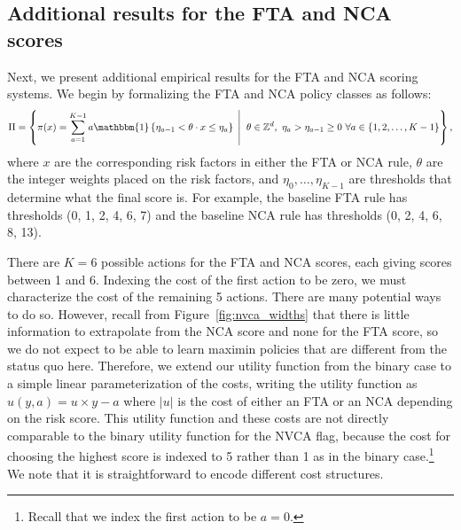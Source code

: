 \documentclass[12pt]{article}
\theoremstyle{definition}
\newcommand{\Z}{\ensuremath{\mathbb{Z}}}
\newcommand{\bbone}{\ensuremath{\mathbbm{1}}}
\newcommand{\<}{\langle}
\renewcommand{\>}{\rangle}
\begin{document}
\subsection{Additional results for the FTA and NCA scores}
\label{sec:addl_fta_nca}

Next, we present additional empirical results for the FTA and NCA
scoring systems.  We begin by formalizing the FTA and NCA policy
classes as follows:
\[
  \label{eq:integer_weight_policy}
  \Pi = \left\{\pi(x) = \sum_{a = 1}^{K-1}a \bbone\left\{\eta_{a-1} <
      \theta \cdot x \leq \eta_a \right\} \; \left \vert
      \vphantom{\sum_{j=1}^7 }\right. \; \theta \in \Z^d, \ \eta_a > \eta_{a-1}
    \geq 0 \ \forall a \in \{1, 2, \ldots, K-1\} \right\},
\]
where $x$ are the corresponding risk factors in either the FTA or NCA
rule, $\theta$ are the integer weights placed on the risk factors, and
$\eta_0,\ldots,\eta_{K-1}$ are thresholds that determine what the
final score is.  For example, the baseline FTA rule has thresholds (0,
1, 2, 4, 6, 7) and the baseline NCA rule has thresholds (0, 2, 4, 6,
8, 13).

There are $K=6$ possible actions for the FTA and NCA scores, each
giving scores between 1 and 6. Indexing the cost of the first action
to be zero, we must characterize the cost of the remaining 5
actions. There are many potential ways to do so. However, recall from
Figure~\ref{fig:nvca_widths} that there is little information to
extrapolate from the NCA score and none for the FTA score, so we do
not expect to be able to learn maximin policies that are different
from the status quo here.  Therefore, we extend our utility function
from the binary case to a simple linear parameterization of the costs,
writing the utility function as $u(y, a) = u \times y - a$ where $|u|$
is the cost of either an FTA or an NCA depending on the risk
score. This utility function and these costs are not directly
comparable to the binary utility function for the NVCA flag, because
the cost for choosing the highest score is indexed to 5 rather than 1
as in the binary case.\footnote{Recall that we index the first action
  to be $a = 0$.}  We note that it is straightforward to encode
different cost structures.
\end{document}
